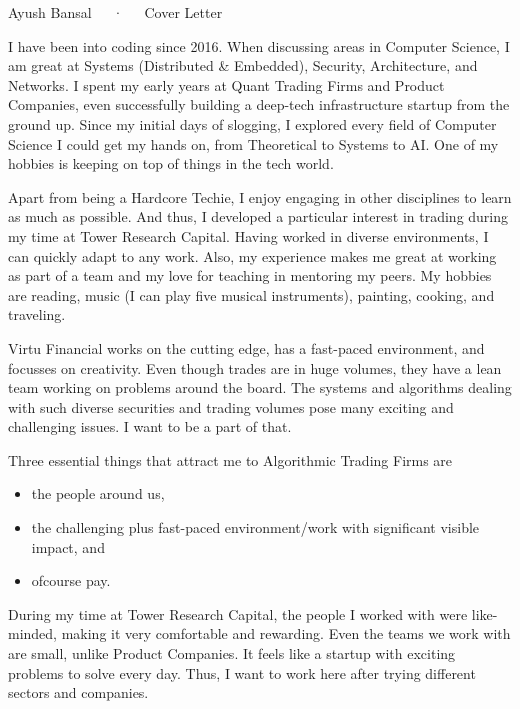 \documentclass[11pt, a4paper]{awesome-cv}
\begin{document}
\makecvheader

\makecvfooter
  {}
  {Ayush Bansal~~~·~~~Cover Letter}
  {\thepage}

\makelettertitle

\begin{cvletter}

  I have been into coding since 2016. When discussing areas in Computer Science, I am great at Systems (Distributed \& Embedded), Security, Architecture, and Networks. I spent my early years at Quant Trading Firms and Product Companies, even successfully building a deep-tech infrastructure startup from the ground up. Since my initial days of slogging, I explored every field of Computer Science I could get my hands on, from Theoretical to Systems to AI. One of my hobbies is keeping on top of things in the tech world.

  Apart from being a Hardcore Techie, I enjoy engaging in other disciplines to learn as much as possible. And thus, I developed a particular interest in trading during my time at Tower Research Capital. Having worked in diverse environments, I can quickly adapt to any work. Also, my experience makes me great at working as part of a team and my love for teaching in mentoring my peers. My hobbies are reading, music (I can play five musical instruments), painting, cooking, and traveling.

  Virtu Financial works on the cutting edge, has a fast-paced environment, and focusses on creativity. Even though trades are in huge volumes, they have a lean team working on problems around the board. The systems and algorithms dealing with such diverse securities and trading volumes pose many exciting and challenging issues. I want to be a part of that.

Three essential things that attract me to Algorithmic Trading Firms are
  \begin{itemize}[noitemsep,topsep=0pt]
    \item the people around us,
    \item the challenging plus fast-paced environment/work with significant visible impact, and
    \item ofcourse pay.
  \end{itemize}
  During my time at Tower Research Capital, the people I worked with were like-minded, making it very comfortable and rewarding. Even the teams we work with are small, unlike Product Companies. It feels like a startup with exciting problems to solve every day. Thus, I want to work here after trying different sectors and companies.


\end{cvletter}
\end{document}
